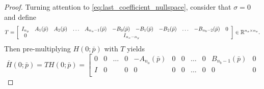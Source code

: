\begin{proof}
    Turning attention to \eqref{eq:last_coefficient_nullspace}, consider that $\sigma = 0$ and define 
    \begin{equation}
        T = \left[\begin{array}{ccccccccccc} I_{n_y} & A_1(\bar{p}) & A_2(\bar{p}) & \hdots & A_{n_a-1}(\bar{p}) & -B_0(\bar{p}) & -B_1(\bar{p}) & -B_2(\bar{p}) & \hdots & -B_{n_b-2}(\bar{p}) & 0 \\ 0 & \multicolumn{10}{c}{I_{n_x-n_y}} \end{array}\right] \in \Ree^{n_x\times n_x}.
    \end{equation} 
    Then pre-multiplying $H(0;\bar{p})$ with $T$ yields
    \begin{equation}
        \bar{H}(0;\bar{p}) = T H(0;\bar{p}) = 
        \left[
        \begin{array}{ccccc|ccccc|c}
        0 & 0 & \hdots & 0 & -A_{n_a}(\bar{p}) & 0 & 0 & \hdots & 0 & B_{n_b-1}(\bar{p}) & 0 \\
        I & 0 & & 0 & 0 & 0 & 0 & \hdots & 0 & 0 & 0 \\

\end{array}
\end{equation}
\end{proof}
